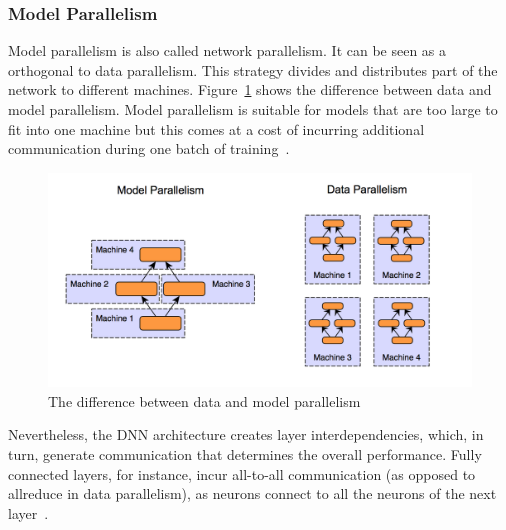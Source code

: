 \subsubsection{Model Parallelism}
Model parallelism is also called network parallelism. It can be seen as a 
orthogonal to data parallelism. This strategy divides and distributes part of 
the network to different machines. Figure~\ref{fig:model} shows the difference 
between data and model parallelism. Model parallelism is suitable for models 
that are too large to fit into one machine but this comes at a cost of incurring 
additional communication during one batch of training~\cite{model0}.
\begin{figure}[H]
    \centerline{\includegraphics[scale=0.60]{background/figs/model_parallelism.png}}
    \caption{The difference between data and model parallelism}
    \label{fig:model}
\end{figure}

Nevertheless, the DNN architecture creates layer interdependencies, which, in 
turn, generate communication that determines the overall performance. Fully
connected layers, for instance, incur all-to-all communication (as opposed to 
allreduce in data parallelism), as neurons connect to all the neurons of the 
next layer~\cite{model1}.
